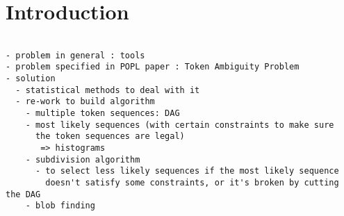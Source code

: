 \section{Introduction}\label{sec:intro}

\begin{verbatim}

- problem in general : tools
- problem specified in POPL paper : Token Ambiguity Problem
- solution
  - statistical methods to deal with it
  - re-work to build algorithm
    - multiple token sequences: DAG
    - most likely sequences (with certain constraints to make sure 
      the token sequences are legal) 
       => histograms
    - subdivision algorithm
      - to select less likely sequences if the most likely sequence 
        doesn't satisfy some constraints, or it's broken by cutting the DAG
    - blob finding
\end{verbatim}
